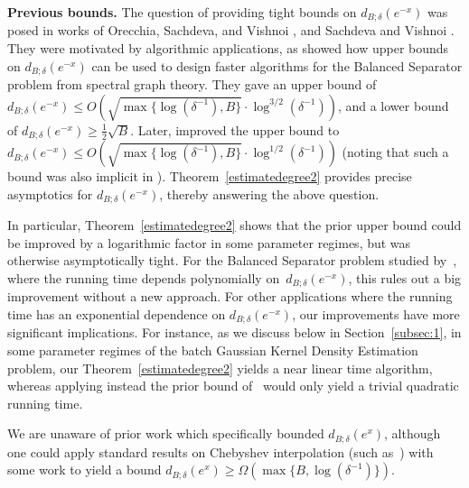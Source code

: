 \textbf{Previous bounds.} The question of providing tight bounds on $d_{B; \delta} (e^{-x})$ was posed in works of Orecchia, Sachdeva, and Vishnoi \cite[Sections 4 and 7]{orecchia2012approximating}, and Sachdeva and Vishnoi \cite[Section 5]{sachdeva2014faster}. They were motivated by algorithmic applications, as \cite{orecchia2012approximating} showed how upper bounds on $d_{B; \delta} (e^{-x})$ can be used to design faster algorithms for the Balanced Separator problem from spectral graph theory. They gave an upper bound of $d_{B; \delta} (e^{-x}) \leq O(\sqrt{\max \{ \log (\delta^{-1}), B \}} \cdot \log^{3/2} (\delta^{-1}))$, and a lower bound of $d_{B; \delta} (e^{-x}) \geq \frac12 \sqrt{B}$. Later, \cite{sachdeva2014faster} improved the upper bound to $d_{B; \delta} (e^{-x}) \leq O(\sqrt{\max \{ \log (\delta^{-1}), B \}} \cdot \log^{1/2} (\delta^{-1}))$ (noting that such a bound was also implicit in \cite{hochbruck1997krylov}). Theorem~\ref{estimatedegree2} provides precise asymptotics for $d_{B; \delta} (e^{-x})$, thereby answering the above question.
 
 In particular, Theorem~\ref{estimatedegree2} shows that the prior upper bound could be improved by a logarithmic factor in some parameter regimes, but was otherwise asymptotically tight. For the Balanced Separator problem studied by~\cite{orecchia2012approximating}, where the running time depends polynomially on~$d_{B; \delta} (e^{-x})$, this rules out a big improvement without a new approach. For other applications where the running time has an exponential dependence on $d_{B; \delta} (e^{-x})$, our improvements have more significant implications. For instance, as we discuss below in Section~\ref{subsec:1}, in some parameter regimes of the batch Gaussian Kernel Density Estimation problem, our Theorem~\ref{estimatedegree2} yields a near linear time algorithm, whereas applying instead the prior bound of~\cite{sachdeva2014faster} would only yield a trivial quadratic running time.
 
 We are unaware of prior work which specifically bounded $d_{B; \delta} (e^{x})$, although one could apply standard results on Chebyshev interpolation (such as~\cite[{Theorem 8.2}]{AT}) with some work to yield a bound $d_{B; \delta} (e^{x}) \geq \Omega(\max\{B, \log(\delta^{-1}) \})$.\\

